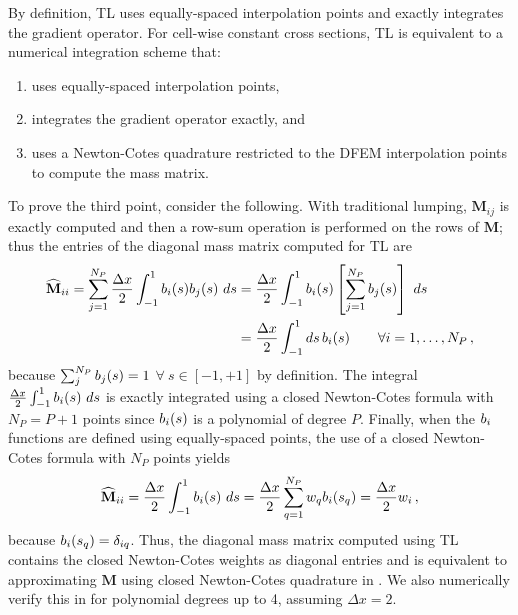 
By definition, TL uses equally-spaced interpolation points and exactly integrates the gradient operator. 
For cell-wise constant cross sections, TL is equivalent to a numerical integration scheme that:
\begin{enumerate}
\item uses equally-spaced interpolation points, 
\item integrates the gradient operator exactly, and  
\item uses a Newton-Cotes quadrature restricted to the DFEM interpolation points to compute the mass matrix.
\end{enumerate}
To prove the third point, consider the following.
With traditional lumping, $\mathbf{M}_{ij}$ is exactly computed and then a row-sum operation is performed on the rows of $\mathbf{ M}$; thus the entries of the diagonal mass matrix computed for TL are
\begin{align}
\widehat{\mathbf M}_{ii} = \sum_{j=1}^{N_P}{ \frac{\Delta x}{2} \int_{-1}^1 b_{i} (s)b_{j} (s) ~ds}
&=  \frac{\Delta x}{2}\int_{-1}^1{ b_{i} (s) \left[  \sum_{j=1}^{N_P} b_{j} (s)\right]~ds  } 
 \notag \\ 
&=\frac{\Delta x}{2} \int_{-1}^1{ds\, b_{i} (s) }\qquad \forall i=1,\ldots,N_P \, ,
\end{align}
because $\sum_j^{N_P}{ b_{j} (s)} =1$ $\forall ~s\in [-1,+1]$ by definition.  
The integral $\frac{\Delta x}{2}\int_{-1}^1{ b_{i} (s)~ds}$ is exactly integrated using a closed Newton-Cotes formula with $N_P=P+1$ points since $b_{i} (s)$ is a polynomial of degree $P$. 
Finally, when the $b_{i} $ functions are defined using
equally-spaced points,  the use of a closed Newton-Cotes formula with $N_P$ points yields
\begin{equation}
\widehat{\mathbf M}_{ii} = \frac{\Delta x}{2} \int_{-1}^1{ b_{i} (s)~ds}  = \frac{\Delta x}{2} \sum_{q=1}^{N_P} {w_q b_{i} (s_q)} = \frac{\Delta x}{2}w_i \, ,
\end{equation}
because $b_{i} (s_q) =\delta_{iq}$. 
Thus, the diagonal mass matrix computed using TL contains the closed Newton-Cotes weights as diagonal entries and is equivalent to approximating $\mathbf{M}$ using closed Newton-Cotes quadrature in . 
We also numerically verify this in  for polynomial degrees up to 4, assuming $\Delta x = 2$.
